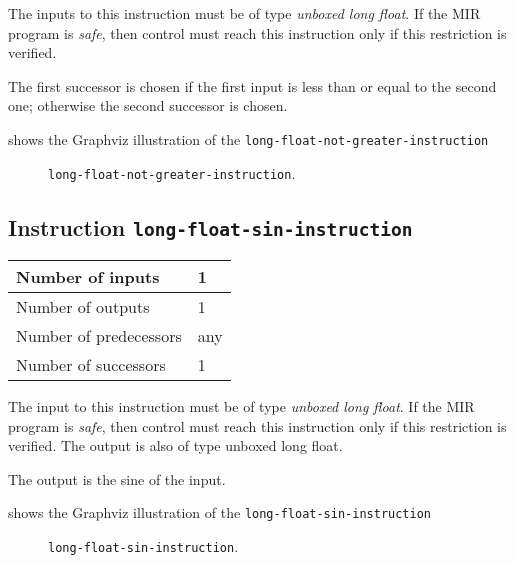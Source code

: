 The inputs to this instruction must be of type \emph{unboxed long
  float}.  If the MIR program is \emph{safe}, then control must reach
this instruction only if this restriction is verified.

The first successor is chosen if the first input is less than or equal
to the second one; otherwise the second successor is chosen.

 shows the Graphviz illustration of the
\texttt{long-float-not-greater-instruction}

\begin{figure}
\begin{center}
\end{center}
\caption{\label{fig-long-float-not-greater-instruction}
\texttt{long-float-not-greater-instruction}.}
\end{figure}

\subsection{Instruction \texttt{long-float-sin-instruction}}
\label{mir-instruction-long-float-div}

\begin{tabular}{|l|l|}
\hline
Number of inputs & 1\\
\hline
Number of outputs & 1\\
\hline
Number of predecessors & any\\
\hline
Number of successors & 1\\
\hline
\end{tabular}

The input to this instruction must be of type \emph{unboxed long
  float}.  If the MIR program is \emph{safe}, then control must reach
this instruction only if this restriction is verified.  The output is
also of type unboxed long float.

The output is the sine of the input.

 shows the Graphviz illustration of the
\texttt{long-float-sin-instruction}

\begin{figure}
\begin{center}
\end{center}
\caption{\label{fig-long-float-sin-instruction}
\texttt{long-float-sin-instruction}.}
\end{figure}

